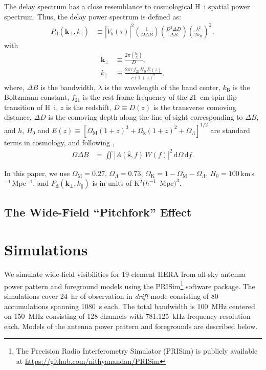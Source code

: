 \documentclass[preprint2,iop,numberedappendix,twocolappendix,appendixfloats]{emulateapj}
\newcommand{\dif}{\mathrm{d}}
\begin{document}
The delay spectrum has a close resemblance to cosmological H~{\sc i} spatial power spectrum. Thus, the delay power spectrum is defined as:
\begin{align}\label{eqn:delay-power-spectrum}
  P_\textrm{d}(\boldsymbol{k}_\perp,k_\parallel) &\equiv |\tilde{V}_b(\tau)|^2\left(\frac{1}{\Omega\Delta B}\right)\left(\frac{D^2\Delta D}{\Delta B}\right)\left(\frac{\lambda^2}{2k_\textrm{B}}\right)^2,
\end{align}
with
\begin{align}
  \boldsymbol{k}_\perp &\equiv \frac{2\pi(\frac{\boldsymbol{b}}{\lambda})}{D}, \\
  k_\parallel &\equiv \frac{2\pi\tau\,f_{21}H_0\,E(z)}{c(1+z)^2}, 
\end{align}
where, $\Delta B$ is the bandwidth, $\lambda$ is the wavelength of the band center, $k_\textrm{B}$ is the Boltzmann constant, $f_{21}$ is the rest frame frequency of the 21~cm spin flip transition of H~{\sc i}, $z$ is the redshift, $D\equiv D(z)$ is the transverse comoving distance, $\Delta D$ is the comoving depth along the line of sight corresponding to $\Delta B$, and $h$, $H_0$ and $E(z)\equiv [\Omega_\textrm{M}(1+z)^3+\Omega_\textrm{k}(1+z)^2+\Omega_\Lambda]^{1/2}$ are standard terms in cosmology, and following \citet{par14},
\begin{align}
  \Omega\Delta B &= \iint \left|A(\hat{\boldsymbol{s}},f)\,W(f)\right|^2\,\dif\Omega\,\dif f.
\end{align}

In this paper, we use $\Omega_\textrm{M}=0.27$, $\Omega_\Lambda=0.73$, $\Omega_\textrm{K}=1-\Omega_\textrm{M}-\Omega_\Lambda$, $H_0=100\,$km$\,$s$^{-1}\,$Mpc$^{-1}$, and $P_\textrm{d}(\boldsymbol{k}_\perp,k_\parallel)$ is in units of K$^2 (h^{-1}$~Mpc$)^3$.

\subsection{The Wide-Field ``Pitchfork'' Effect}\label{sec:wide-field}

\citep{thy15a,thy15b}

\section{Simulations}\label{sec:sim}

We simulate wide-field visibilities for 19-element HERA from all-sky antenna power pattern and foreground models using the PRISim\footnote{The Precision Radio Interferometry Simulator (PRISim) is publicly available at \href{https://github.com/nithyanandan/PRISim}{https://github.com/nithyanandan/PRISim}} software package. The simulations cover 24~hr of observation in {\it drift} mode consisting of 80 accumulations spanning 1080~s each. The total bandwidth is 100~MHz centered on 150~MHz consisting of 128 channels with 781.125~kHz frequency resolution each. Models of the antenna power pattern and foregrounds are described below.
\end{document}
